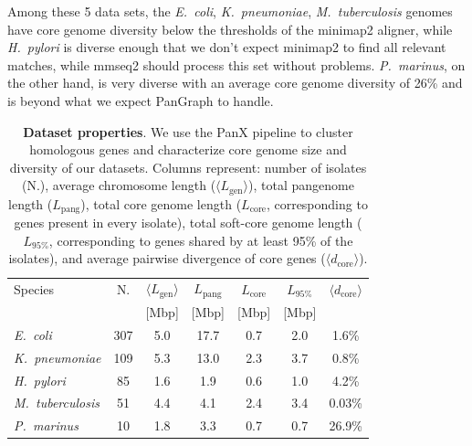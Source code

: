\documentclass[aps,rmp,preprint,superscriptaddress,10pt,linenumbers]{revtex4-1}
\newcommand{\avg}[1]{\langle #1 \rangle}
\newcommand{\Lcore}{L_\text{core}}
\newcommand{\Lsoftcore}{L_\text{95\%}}
\newcommand{\Lpang}{L_\text{pang}}
\newcommand{\Lgen}{L_\text{gen}}
\newcommand{\dcore}{\langle d_\text{core} \rangle}
\begin{document}
Among these 5 data sets, the \textit{E.~coli}, \textit{K.~pneumoniae}, \textit{M.~tuberculosis} genomes have core genome diversity below the thresholds of the minimap2 aligner, while \textit{H.~pylori} is diverse enough that we don't expect minimap2 to find all relevant matches, while mmseq2 should process this set without problems.
\textit{P.~marinus}, on the other hand, is very diverse with an average core genome diversity of 26\% and is beyond what we expect PanGraph to handle.




\begin{table}[h]
    \setlength{\tabcolsep}{6pt}
    \begin{tabular}{l c c c c c c}
        \hline\hline
        Species                  & N.  & $\avg{\Lgen}$ & $\Lpang$ & $\Lcore$ & $\Lsoftcore$ & $\dcore$ \\
                                 &     & [Mbp]         & [Mbp]    & [Mbp]    & [Mbp]        &          \\
        \hline
        \textit{E.~coli}         & 307 & 5.0           & 17.7     & 0.7      & 2.0          & 1.6\%    \\
        \textit{K.~pneumoniae}   & 109 & 5.3           & 13.0     & 2.3      & 3.7          & 0.8\%    \\
        \textit{H.~pylori}       & 85  & 1.6           & 1.9      & 0.6      & 1.0          & 4.2\%    \\
        \textit{M.~tuberculosis} & 51  & 4.4           & 4.1      & 2.4      & 3.4          & 0.03\%   \\
        \textit{P.~marinus}      & 10  & 1.8           & 3.3      & 0.7      & 0.7          & 26.9\%   \\
        \hline
    \end{tabular}
    \caption{{\bf Dataset properties}. We use the PanX pipeline to cluster homologous genes and characterize core genome size and diversity of our datasets. Columns represent:
        number of isolates (N.),
        average chromosome length ($\avg{\Lgen}$),
        total pangenome length ($\Lpang$),
        total core genome length ($\Lcore$, corresponding to genes present in every isolate),
        total soft-core genome length ($\Lsoftcore$, corresponding to genes shared by at least 95\% of the isolates),
        and average pairwise divergence of core genes ($\dcore$).
    }
    \label{table:panx-dataset}
\end{table}
\end{document}

